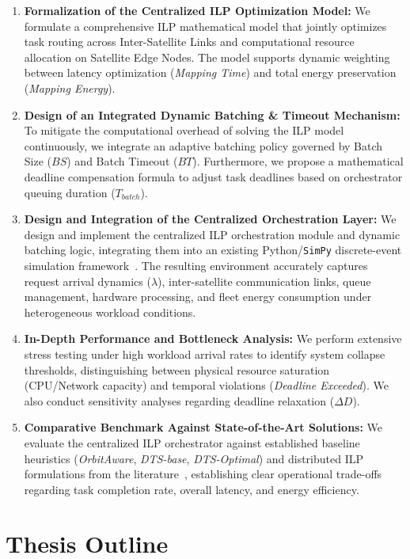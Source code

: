 \begin{enumerate}
    \item \textbf{Formalization of the Centralized ILP Optimization Model:} We formulate a comprehensive ILP mathematical model that jointly optimizes task routing across Inter-Satellite Links and computational resource allocation on Satellite Edge Nodes. The model supports dynamic weighting between latency optimization (\textit{Mapping Time}) and total energy preservation (\textit{Mapping Energy}).
    \item \textbf{Design of an Integrated Dynamic Batching \& Timeout Mechanism:} To mitigate the computational overhead of solving the ILP model continuously, we integrate an adaptive batching policy governed by Batch Size ($BS$) and Batch Timeout ($BT$). Furthermore, we propose a mathematical deadline compensation formula to adjust task deadlines based on orchestrator queuing duration ($T_{batch}$).
    \item \textbf{Design and Integration of the Centralized Orchestration Layer:} We design and implement the centralized ILP orchestration module and dynamic batching logic, integrating them into an existing Python/\texttt{SimPy} discrete-event simulation framework~\cite{simpy2023, pulp2011}. The resulting environment accurately captures request arrival dynamics ($\lambda$), inter-satellite communication links, queue management, hardware processing, and fleet energy consumption under heterogeneous workload conditions.
    \item \textbf{In-Depth Performance and Bottleneck Analysis:} We perform extensive stress testing under high workload arrival rates to identify system collapse thresholds, distinguishing between physical resource saturation (CPU/Network capacity) and temporal violations (\textit{Deadline Exceeded}). We also conduct sensitivity analyses regarding deadline relaxation ($\Delta D$).
    \item \textbf{Comparative Benchmark Against State-of-the-Art Solutions:} We evaluate the centralized ILP orchestrator against established baseline heuristics (\textit{OrbitAware}, \textit{DTS-base}, \textit{DTS-Optimal}) and distributed ILP formulations from the literature~\cite{icdcs_satellite_2025}, establishing clear operational trade-offs regarding task completion rate, overall latency, and energy efficiency.
\end{enumerate}

\section{Thesis Outline}
\label{sec:intro_outline}

